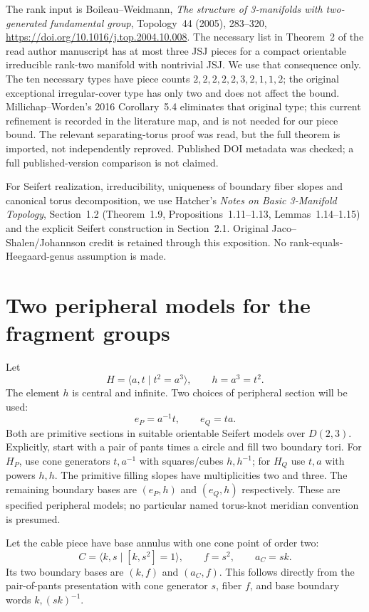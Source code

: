 \documentclass[11pt]{article}
\begin{document}
The rank input is Boileau--Weidmann, \emph{The structure of 3-manifolds
with two-generated fundamental group}, Topology~44 (2005), 283--320,
\url{https://doi.org/10.1016/j.top.2004.10.008}. The necessary list in
Theorem~2 of the read author manuscript has at most three JSJ pieces
for a compact orientable irreducible rank-two manifold with nontrivial
JSJ. We use that consequence only. The ten necessary types have piece
counts $2,2,2,2,2,3,2,1,1,2$; the original exceptional irregular-cover
type has only two and does not affect the bound. Millichap--Worden's
2016 Corollary~5.4 eliminates that original type; this current refinement
is recorded in the literature map, and is not needed for our piece bound.
The relevant
separating-torus proof was read, but the full theorem is imported,
not independently reproved. Published DOI metadata was checked;
a full published-version comparison is not claimed.

For Seifert realization, irreducibility, uniqueness of boundary fiber
slopes and canonical torus decomposition, we use Hatcher's
\emph{Notes on Basic 3-Manifold Topology}, Section~1.2
(Theorem~1.9, Propositions~1.11--1.13, Lemmas~1.14--1.15) and the
explicit Seifert construction in Section~2.1. Original
Jaco--Shalen/Johannson credit is retained through this exposition.
No rank-equals-Heegaard-genus assumption is made.

\section{Two peripheral models for the fragment groups}

Let
\[
 H=\langle a,t\mid t^2=a^3\rangle,
 \qquad h=a^3=t^2.
\]
The element $h$ is central and infinite. Two choices of peripheral
section will be used:
\[
 e_P=a^{-1}t,\qquad e_Q=ta.
\]
Both are primitive sections in suitable orientable Seifert models over
$D(2,3)$. Explicitly, start with a pair of pants times a circle and
fill two boundary tori. For $H_P$, use cone generators $t,a^{-1}$ with
squares/cubes $h,h^{-1}$; for $H_Q$ use $t,a$ with powers $h,h$.
The primitive filling slopes have multiplicities two and three.
The remaining boundary bases are $(e_P,h)$ and $(e_Q,h)$ respectively.
These are specified peripheral models; no particular named torus-knot
meridian convention is presumed.

Let the cable piece have base annulus with one cone point of order two:
\[
 C=\langle k,s\mid[k,s^2]=1\rangle,\qquad
 f=s^2,\qquad a_C=sk.
\]
Its two boundary bases are $(k,f)$ and $(a_C,f)$. This follows directly
from the pair-of-pants presentation with cone generator $s$, fiber $f$,
and base boundary words $k,(sk)^{-1}$.
\end{document}
